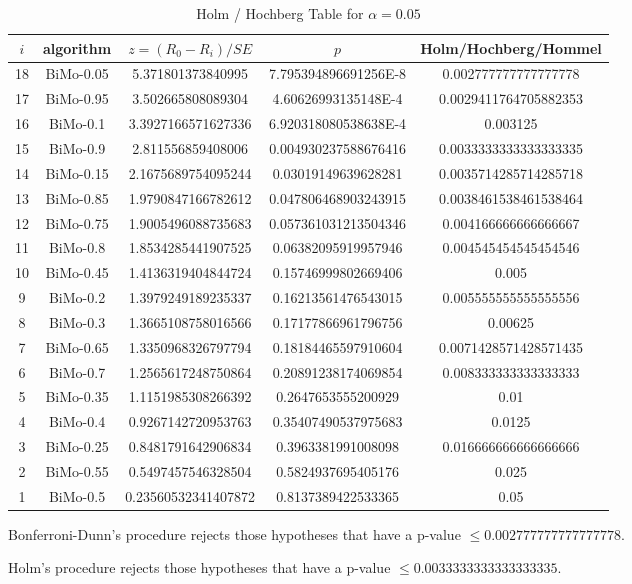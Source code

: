 \documentclass[a4paper,10pt]{article}
\begin{document}
\begin{landscape}
\begin{table}[!htp]
\centering\tiny
\caption{Holm / Hochberg Table for $\alpha=0.05$}
\begin{tabular}{ccccc}
$i$&algorithm&$z=(R_0 - R_i)/SE$&$p$&Holm/Hochberg/Hommel\\
\hline
18&BiMo-0.05&5.371801373840995&7.795394896691256E-8&0.002777777777777778\\
17&BiMo-0.95&3.502665808089304&4.60626993135148E-4&0.0029411764705882353\\
16&BiMo-0.1&3.3927166571627336&6.920318080538638E-4&0.003125\\
15&BiMo-0.9&2.811556859408006&0.004930237588676416&0.0033333333333333335\\
14&BiMo-0.15&2.1675689754095244&0.03019149639628281&0.0035714285714285718\\
13&BiMo-0.85&1.9790847166782612&0.047806468903243915&0.0038461538461538464\\
12&BiMo-0.75&1.9005496088735683&0.057361031213504346&0.004166666666666667\\
11&BiMo-0.8&1.8534285441907525&0.06382095919957946&0.004545454545454546\\
10&BiMo-0.45&1.4136319404844724&0.15746999802669406&0.005\\
9&BiMo-0.2&1.3979249189235337&0.16213561476543015&0.005555555555555556\\
8&BiMo-0.3&1.3665108758016566&0.17177866961796756&0.00625\\
7&BiMo-0.65&1.3350968326797794&0.18184465597910604&0.0071428571428571435\\
6&BiMo-0.7&1.2565617248750864&0.20891238174069854&0.008333333333333333\\
5&BiMo-0.35&1.1151985308266392&0.2647653555200929&0.01\\
4&BiMo-0.4&0.9267142720953763&0.35407490537975683&0.0125\\
3&BiMo-0.25&0.8481791642906834&0.3963381991008098&0.016666666666666666\\
2&BiMo-0.55&0.5497457546328504&0.5824937695405176&0.025\\
1&BiMo-0.5&0.23560532341407872&0.8137389422533365&0.05\\
\hline
\end{tabular}
\end{table}
Bonferroni-Dunn's procedure rejects those hypotheses that have a p-value $\le0.002777777777777778$.


Holm's procedure rejects those hypotheses that have a p-value $\le0.0033333333333333335$.



\end{landscape}
\end{document}
